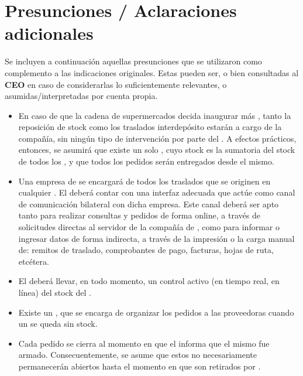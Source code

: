 
\section{Presunciones / Aclaraciones adicionales}

Se incluyen a continuación aquellas presunciones que se utilizaron como
complemento a las indicaciones originales. Estas pueden ser, o bien consultadas
al \textbf{CEO} en caso de considerarlas lo suficientemente relevantes, o
asumidas/interpretadas por cuenta propia.

\begin{itemize}

  \item En caso de que la cadena de supermercados decida inaugurar más
\textbf{}, tanto la reposición de stock como los traslados
interdepósito estarán a cargo de la compañía, sin ningún tipo de intervención
por parte del \textbf{}. A efectos prácticos, entonces, se asumirá
que existe un solo \textbf{}, cuyo stock es la sumatoria del stock
de todos los \textbf{}, y que todos los pedidos serán entregados
desde el mismo.

  \item Una empresa de \textbf{} se encargará de todos los
traslados que se originen en cualquier \textbf{}. El
\textbf{} deberá contar con una interfaz adecuada que actúe como
canal de comunicación bilateral con dicha empresa. Este canal deberá ser apto
tanto para realizar consultas y pedidos de forma online, a través de solicitudes
directas al servidor de la compañía de \textbf{}, como para
informar o ingresar datos de forma indirecta, a través de la impresión o la
carga manual de: remitos de traslado, comprobantes de pago, facturas, hojas de
ruta, etcétera.

  \item El \textbf{} deberá llevar, en todo momento, un control
activo (en tiempo real, en línea) del stock del \textbf{}.

  \item Existe un \textbf{}, que se encarga de
organizar los pedidos a las proveedoras cuando un \textbf{} se
queda sin stock.


  \item Cada pedido se cierra al momento en que el \textbf{}
informa que el mismo fue armado. Consecuentemente, se asume que estos no
necesariamente permanecerán abiertos hasta el momento en que son retirados por
\textbf{}.

\end{itemize}
